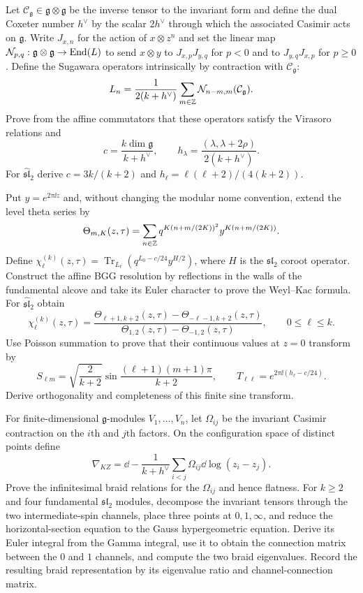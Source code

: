 \begin{exercise}
Let $\mathcal C_{\mathfrak g}\in\mathfrak g\otimes\mathfrak g$ be the inverse
tensor to the invariant form and define the dual Coxeter number $h^\vee$ by
the scalar $2h^\vee$ through which the associated Casimir acts on
$\mathfrak g$.  Write $J_{x,n}$ for the action of $x\otimes z^n$ and set
the linear map
$\mathcal N_{p,q}:\mathfrak g\otimes\mathfrak g\to\operatorname{End}(L)$ to send
$x\otimes y$ to $J_{x,p}J_{y,q}$ for $p<0$ and to
$J_{y,q}J_{x,p}$ for $p\geq0$.  Define the Sugawara operators intrinsically
by contraction with $\mathcal C_{\mathfrak g}$:
\[
 L_n=\frac1{2(k+h^\vee)}
 \sum_{m\in\mathbb Z}\mathcal N_{n-m,m}(\mathcal C_{\mathfrak g}).
\]
Prove from the affine commutators that these operators satisfy the Virasoro
relations and
\[
 c=\frac{k\dim\mathfrak g}{k+h^\vee},\qquad
 h_\lambda=\frac{(\lambda,\lambda+2\rho)}{2(k+h^\vee)}.
\]
For $\widehat{\mathfrak{sl}}_2$ derive
$c=3k/(k+2)$ and $h_\ell=\ell(\ell+2)/(4(k+2))$.
\end{exercise}

\begin{exercise}
Put $y=e^{2\pi\ii z}$ and, without changing the modular nome convention,
extend the level theta series by
\[
 \Theta_{m,K}(z,\tau)=\sum_{n\in\mathbb Z}
 q^{K(n+m/(2K))^2}y^{K(n+m/(2K))}.
\]
Define
$\chi_\ell^{(k)}(z,\tau)=
\operatorname{Tr}_{L_\ell}(q^{L_0-c/24}y^{H/2})$, where $H$ is the
$\mathfrak{sl}_2$ coroot operator.  Construct the affine BGG resolution by
reflections in the walls of the
fundamental alcove and take its Euler character to prove the Weyl--Kac
formula.  For $\widehat{\mathfrak{sl}}_2$ obtain
\[
 \chi_\ell^{(k)}(z,\tau)=
 \frac{\Theta_{\ell+1,k+2}(z,\tau)-
       \Theta_{-\ell-1,k+2}(z,\tau)}
      {\Theta_{1,2}(z,\tau)-\Theta_{-1,2}(z,\tau)},
 \qquad 0\leq\ell\leq k.
\]
Use Poisson summation to prove that their continuous values at $z=0$
transform by
\[
 S_{\ell m}=\sqrt{\frac2{k+2}}
 \sin\!\frac{(\ell+1)(m+1)\pi}{k+2},\qquad
 T_{\ell\ell}=e^{2\pi\ii(h_\ell-c/24)}.
\]
Derive orthogonality and completeness of this finite sine transform.
\end{exercise}

\begin{exercise}
For finite-dimensional $\mathfrak g$-modules $V_1,\ldots,V_n$, let
$\Omega_{ij}$ be the invariant Casimir contraction on the $i$th and $j$th
factors.  On the configuration space of distinct points define
\[
 \nabla_{KZ}=\dd-\frac1{k+h^\vee}
 \sum_{i<j}\Omega_{ij}\dd\log(z_i-z_j).
\]
Prove the infinitesimal braid relations for the $\Omega_{ij}$ and hence
flatness.  For $k\geq2$ and four fundamental $\mathfrak{sl}_2$ modules,
decompose the
invariant tensors through the two intermediate-spin channels, place three
points at $0,1,\infty$, and reduce the horizontal-section equation to the
Gauss hypergeometric equation.  Derive its Euler integral
from the Gamma integral, use it to obtain the connection matrix between the
$0$ and $1$ channels, and compute
the two braid eigenvalues.  Record the resulting braid representation by its
eigenvalue ratio and channel-connection matrix.
\end{exercise}


